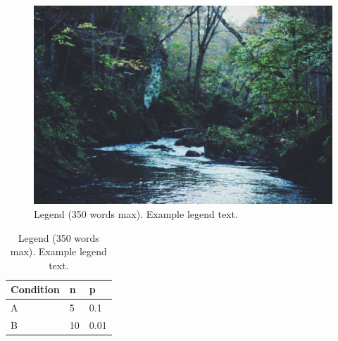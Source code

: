 \documentclass[fleqn,10pt]{wlscirep}
\begin{document}
\begin{figure}[ht]
\centering
\includegraphics[width=\linewidth]{stream}
\caption{Legend (350 words max). Example legend text.}
\label{fig:stream}
\end{figure}

\begin{table}[ht]
\centering
\begin{tabular}{|l|l|l|}
\hline
Condition & n & p \\
\hline
A & 5 & 0.1 \\
\hline
B & 10 & 0.01 \\
\hline
\end{tabular}
\caption{\label{tab:example}Legend (350 words max). Example legend text.}
\end{table}
\end{document}
